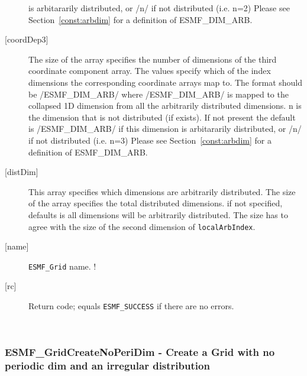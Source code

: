 \begin{description}
       is arbitararily distributed, or /n/ if not distributed (i.e. n=2)
       Please see Section~\ref{const:arbdim} for a definition of ESMF\_DIM\_ARB.
   \item[{[coordDep3]}]
       The size of the array specifies the number of dimensions of the
       third coordinate component array. The values specify which
       of the index dimensions the corresponding coordinate
       arrays map to. The format should be /ESMF\_DIM\_ARB/ where
       /ESMF\_DIM\_ARB/ is mapped to the collapsed 1D dimension from all
       the arbitrarily distributed dimensions.  n is the dimension that
       is not distributed (if exists).
       If not present the default is /ESMF\_DIM\_ARB/ if this dimension
       is arbitararily distributed, or /n/ if not distributed (i.e. n=3)
       Please see Section~\ref{const:arbdim} for a definition of ESMF\_DIM\_ARB.
   \item[{[distDim]}]
         This array specifies which dimensions are arbitrarily distributed.
         The size of the array specifies the total distributed dimensions.
         if not specified, defaults is all dimensions will be arbitrarily
         distributed.  The size has to agree with the size of the second
         dimension of {\tt localArbIndex}.
   \item[{[name]}]
         {\tt ESMF\_Grid} name.
  ! \item[{[rc]}]
        Return code; equals {\tt ESMF\_SUCCESS} if there are no errors.
   \end{description}
   
 
\mbox{}\hrulefill\ 
 
\subsubsection [ESMF\_GridCreateNoPeriDim] {ESMF\_GridCreateNoPeriDim - Create a Grid with no periodic dim and an irregular distribution}


